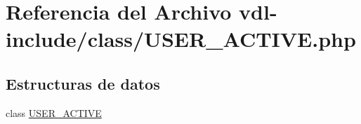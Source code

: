 \hypertarget{USER__ACTIVE_8php}{\section{Referencia del Archivo vdl-\/include/class/\-U\-S\-E\-R\-\_\-\-A\-C\-T\-I\-V\-E.php}
\label{USER__ACTIVE_8php}
}
\subsection*{Estructuras de datos}
\begin{DoxyCompactItemize}
\item 
class \hyperlink{classUSER__ACTIVE}{U\-S\-E\-R\-\_\-\-A\-C\-T\-I\-V\-E}
\end{DoxyCompactItemize}
